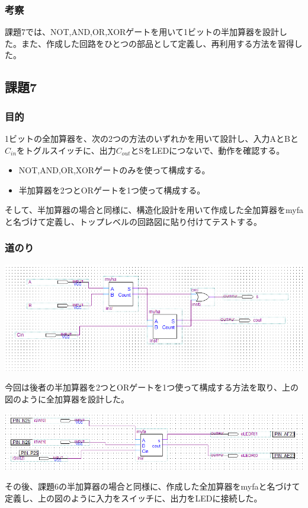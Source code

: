 \documentclass[a4paper]{jarticle}
\begin{document}
\subsubsection{考察}
課題7では、NOT,AND,OR,XORゲートを用いて1ビットの半加算器を設計した。また、作成した回路をひとつの部品として定義し、再利用する方法を習得した。
\subsection{課題7}
\subsubsection{目的}
1ビットの全加算器を、次の2つの方法のいずれかを用いて設計し、入力AとBと$C_{in}$をトグルスイッチに、出力$C_{out}$とSをLEDにつないで、動作を確認する。
\begin{itemize}
	\item NOT,AND,OR,XORゲートのみを使って構成する。
	\item 半加算器を2つとORゲートを1つ使って構成する。
\end{itemize}
そして、半加算器の場合と同様に、構造化設計を用いて作成した全加算器をmyfaと名づけて定義し、トップレベルの回路図に貼り付けてテストする。
\subsubsection{道のり}
\begin{center}
	\includegraphics[width=15cm]{work7myfa.PNG}
\end{center}
今回は後者の半加算器を2つとORゲートを1つ使って構成する方法を取り、上の図のように全加算器を設計した。
\begin{center}
	\includegraphics[width=15cm]{work7main.PNG}
\end{center}
その後、課題6の半加算器の場合と同様に、作成した全加算器をmyfaと名づけて定義し、上の図のように入力をスイッチに、出力をLEDに接続した。
\end{document}
